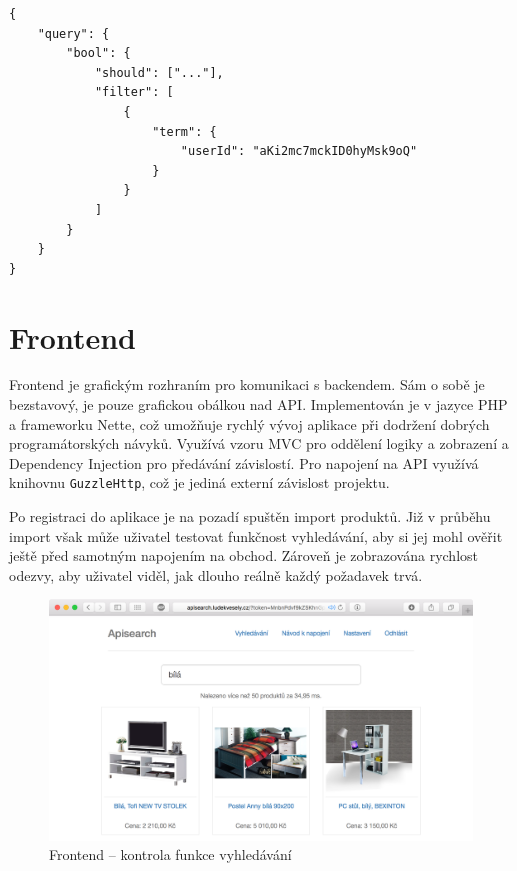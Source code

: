 \documentclass[FM,DP]{tulthesis}
\newenvironment{code}
    {\filbreak\captionsetup{type=listing}}{\filbreak}
\begin{document}
\begin{code}
\captionsetup{singlelinecheck=false,justification=raggedright}
\label{code:es-filter}
\begin{verbatim}
{
    "query": {
        "bool": {
            "should": ["..."],
            "filter": [
                {
                    "term": {
                        "userId": "aKi2mc7mckID0hyMsk9oQ"
                    }
                }
            ]
        }
    }
}
\end{verbatim}
\end{code}

\section{Frontend}

Frontend je grafickým rozhraním pro komunikaci s backendem. Sám o sobě je bezstavový, je pouze
grafickou obálkou nad API. Implementován je v jazyce PHP a frameworku Nette, což umožňuje rychlý
vývoj aplikace při dodržení dobrých programátorských návyků. Využívá vzoru MVC pro oddělení logiky
a zobrazení a Dependency Injection pro předávání závislostí. Pro napojení na API využívá knihovnu 
\verb|GuzzleHttp|, což je jediná externí závislost projektu.

Po registraci do aplikace je na pozadí spuštěn import produktů. Již v průběhu import však může uživatel
testovat funkčnost vyhledávání, aby si jej mohl ověřit ještě před samotným napojením na obchod.
Zároveň je zobrazována rychlost odezvy, aby uživatel viděl, jak dlouho reálně každý požadavek trvá.

\begin{figure}[h]
\center
\includegraphics[width=\textwidth]{frontend.png}
\caption{Frontend -- kontrola funkce vyhledávání}
\label{frontend}
\end{figure}
\end{document}

